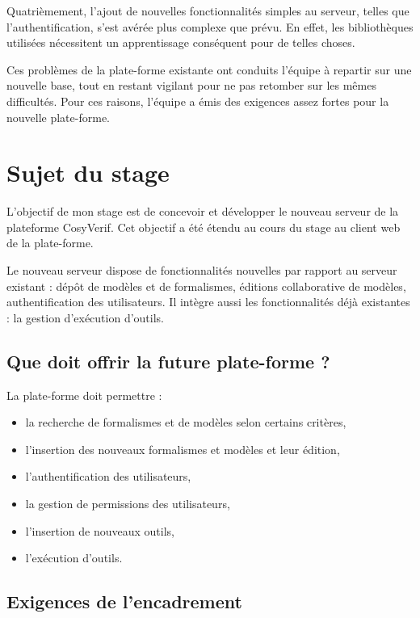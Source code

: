 \documentclass{report}
\begin{document}
Quatrièmement, l'ajout de nouvelles fonctionnalités simples au serveur,
telles que l'authentification, s'est avérée plus complexe que prévu. En
effet, les bibliothèques utilisées nécessitent un apprentissage conséquent
pour de telles choses.

Ces problèmes de la plate-forme existante ont conduits l'équipe à repartir sur une nouvelle base, 
tout en restant vigilant pour ne pas retomber sur les mêmes difficultés.
Pour ces raisons, l'équipe a émis des exigences assez fortes pour 
la nouvelle plate-forme.

\section{Sujet du stage}

L'objectif de mon stage est de concevoir et développer le nouveau serveur de
la plateforme CosyVerif. Cet objectif a été étendu au cours du stage au
client web de la plate-forme.

Le nouveau serveur dispose de fonctionnalités nouvelles par rapport au
serveur existant : dépôt de modèles et de formalismes, éditions
collaborative de modèles, authentification des utilisateurs.
Il intègre aussi les fonctionnalités déjà existantes : la gestion
d'exécution d'outils.

\subsection{Que doit offrir la future plate-forme ?}

La plate-forme doit permettre :

\begin{itemize}
\item la recherche de formalismes et de modèles selon certains critères,
\item l'insertion des nouveaux formalismes et modèles et leur édition,
\item l'authentification des utilisateurs,
\item la gestion de permissions des utilisateurs,
\item l'insertion de nouveaux outils,
\item l'exécution d'outils.
\end{itemize}

\subsection{Exigences de l'encadrement}
\end{document}
